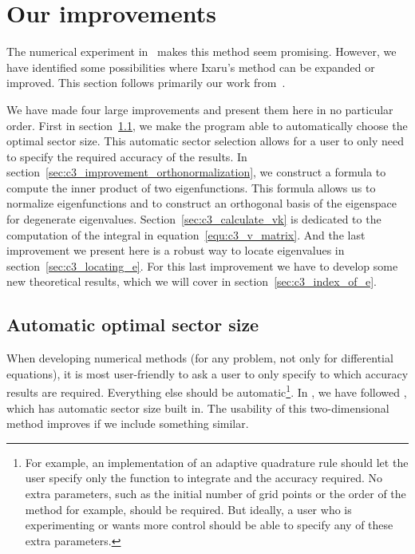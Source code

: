 \section{Our improvements}\label{sec:c3_improvements}

The numerical experiment in~\cite{ixaru_new_2010} makes this method seem promising. However, we have identified some possibilities where Ixaru's method can be expanded or improved. This section follows primarily our work from~\cite{baeyens_fast_2020}.

We have made four large improvements and present them here in no particular order. First in section~\ref{sec:c3_improvement_automatic_sectors}, we make the program able to automatically choose the optimal sector size. This automatic sector selection allows for a user to only need to specify the required accuracy of the results. In section~\ref{sec:c3_improvement_orthonormalization}, we construct a formula to compute the inner product of two eigenfunctions. This formula allows us to normalize eigenfunctions and to construct an orthogonal basis of the eigenspace for degenerate eigenvalues. Section~\ref{sec:c3_calculate_vk} is dedicated to the computation of the integral in equation~\eqref{equ:c3_v_matrix}. And the last improvement we present here is a robust way to locate eigenvalues in section~\ref{sec:c3_locating_e}. For this last improvement we have to develop some new theoretical results, which we will cover in section~\ref{sec:c3_index_of_e}.


\subsection{Automatic optimal sector size}\label{sec:c3_improvement_automatic_sectors}

When developing numerical methods (for any problem, not only for differential equations), it is most user-friendly to ask a user to only specify to which accuracy results are required. Everything else should be automatic\footnote{For example, an implementation of an adaptive quadrature rule should let the user specify only the function to integrate and the accuracy required. No extra parameters, such as the initial number of grid points or the order of the method for example, should be required. But ideally, a user who is experimenting or wants more control should be able to specify any of these extra parameters.}. In , we have followed , which has automatic sector size built in. The usability of this two-dimensional method improves if we include something similar.

